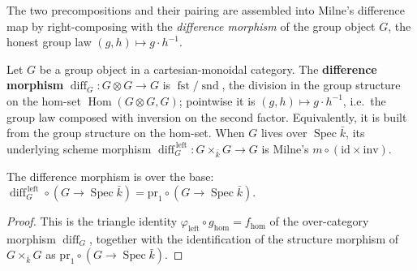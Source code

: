 The two precompositions and their pairing are assembled into Milne's difference map by
right-composing with the \emph{difference morphism} of the group object \(G\), the honest
group law \((g,h) \mapsto g \cdot h^{-1}\).

\begin{definition}\leanok
  \label{def:grpObj_diff}
  Let \(G\) be a group object in a cartesian-monoidal category. The \textbf{difference
  morphism} \(\operatorname{diff}_G \colon G \otimes G \to G\) is
  \(\operatorname{fst} / \operatorname{snd}\), the division in the group structure on the
  hom-set \(\operatorname{Hom}(G \otimes G, G)\); pointwise it is
  \((g,h) \mapsto g \cdot h^{-1}\), i.e.\ the group law composed with inversion on the second
  factor. Equivalently, it is built from the group structure on the hom-set. When \(G\)
  lives over \(\operatorname{Spec}\bar k\), its underlying scheme morphism
  \(\operatorname{diff}_G^{\,\mathrm{left}} \colon G \times_{\bar k} G \to G\) is Milne's
  \(m \circ (\mathrm{id} \times \mathrm{inv})\).
\end{definition}

\begin{lemma}\leanok
  \label{lem:grpObjDiffLeft_comp_hom}
  The difference morphism is over the base: \(\operatorname{diff}_G^{\,\mathrm{left}} \circ
  (G \to \operatorname{Spec}\bar k) = \mathrm{pr}_1 \circ (G \to \operatorname{Spec}\bar k)\).
\end{lemma}
\begin{proof}\leanok
  This is the triangle identity \(\varphi_{\mathrm{left}} \circ g_{\mathrm{hom}} =
  f_{\mathrm{hom}}\) of the over-category morphism \(\operatorname{diff}_G\), together with the
  identification of the structure morphism of \(G \times_{\bar k} G\) as
  \(\mathrm{pr}_1 \circ (G \to \operatorname{Spec}\bar k)\).
\end{proof}

